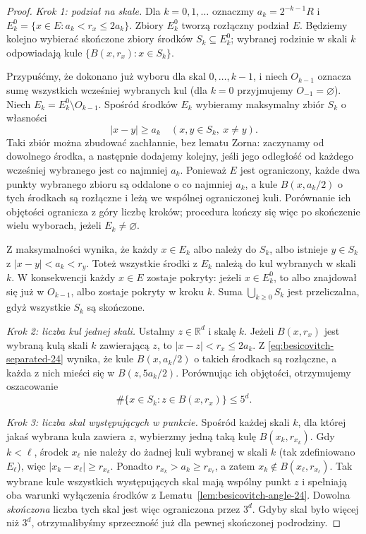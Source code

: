 \begin{proof}
\emph{Krok 1: podział na skale.}
Dla $k=0,1,\ldots$ oznaczmy $a_k=2^{-k-1}R$ i
$E_k^0=\{x\in E:a_k<r_x\le2a_k\}$. Zbiory
$E_k^0$ tworzą rozłączny podział $E$.
Będziemy kolejno wybierać skończone zbiory środków
$S_k\subseteq E_k^0$; wybranej rodzinie w skali $k$
odpowiadają kule $\{B(x,r_x):x\in S_k\}$.

Przypuśćmy, że dokonano już wyboru dla skal
$0,\ldots,k-1$, i niech $O_{k-1}$ oznacza sumę
wszystkich wcześniej wybranych kul (dla $k=0$
przyjmujemy $O_{-1}=\varnothing$).
Niech $E_k=E_k^0\setminus O_{k-1}$. Spośród środków
$E_k$ wybieramy maksymalny zbiór $S_k$ o własności
\begin{equation}\label{eq:besicovitch-separated-24}
 |x-y|\ge a_k\quad(x,y\in S_k,\ x\ne y).
\end{equation}
Taki zbiór można zbudować zachłannie, bez lematu
Zorna: zaczynamy od dowolnego środka, a następnie
dodajemy kolejny, jeśli jego odległość od każdego
wcześniej wybranego jest co najmniej $a_k$.
Ponieważ $E$ jest ograniczony, każde dwa punkty
wybranego zbioru są oddalone o co najmniej $a_k$,
a kule $B(x,a_k/2)$ o tych środkach są rozłączne
i leżą we wspólnej ograniczonej kuli. Porównanie
ich objętości ogranicza z góry liczbę kroków;
procedura kończy się więc po skończenie wielu
wyborach, jeżeli $E_k\ne\varnothing$.

Z maksymalności wynika, że każdy $x\in E_k$
albo należy do $S_k$, albo istnieje $y\in S_k$
z $|x-y|<a_k<r_y$. Toteż wszystkie środki z
$E_k$ należą do kul wybranych w skali $k$.
W konsekwencji każdy $x\in E$ zostaje pokryty:
jeżeli $x\in E_k^0$, to albo znajdował się już
w $O_{k-1}$, albo zostaje pokryty w kroku $k$.
Suma $\bigcup_{k\ge0}S_k$ jest przeliczalna,
gdyż wszystkie $S_k$ są skończone.

\emph{Krok 2: liczba kul jednej skali.}
Ustalmy $z\in\mathbb R^d$ i skalę $k$.
Jeżeli $B(x,r_x)$ jest wybraną kulą skali $k$
zawierającą $z$, to $|x-z|<r_x\le2a_k$.
Z \eqref{eq:besicovitch-separated-24} wynika, że
kule $B(x,a_k/2)$ o takich środkach są rozłączne,
a każda z nich mieści się w $B(z,5a_k/2)$.
Porównując ich objętości, otrzymujemy oszacowanie
\begin{equation}\label{eq:besicovitch-single-scale-24}
 \#\{x\in S_k:z\in B(x,r_x)\}\le5^d.
\end{equation}

\emph{Krok 3: liczba skal występujących w punkcie.}
Spośród każdej skali $k$, dla której jakaś wybrana
kula zawiera $z$, wybierzmy jedną taką kulę
$B(x_k,r_{x_k})$. Gdy $k<\ell$, środek
$x_\ell$ nie należy do żadnej kuli wybranej w
skali $k$ (tak zdefiniowano $E_\ell$), więc
$|x_k-x_\ell|\ge r_{x_k}$. Ponadto
$r_{x_k}>a_k\ge r_{x_\ell}$, a zatem
$x_k\notin B(x_\ell,r_{x_\ell})$.
Tak wybrane kule wszystkich występujących skal
mają wspólny punkt $z$ i spełniają oba warunki
wyłączenia środków z
Lematu~\ref{lem:besicovitch-angle-24}.
Dowolna \emph{skończona} liczba tych skal jest
więc ograniczona przez $3^d$. Gdyby skal było
więcej niż $3^d$, otrzymalibyśmy sprzeczność
już dla pewnej skończonej podrodziny.


\end{proof}
